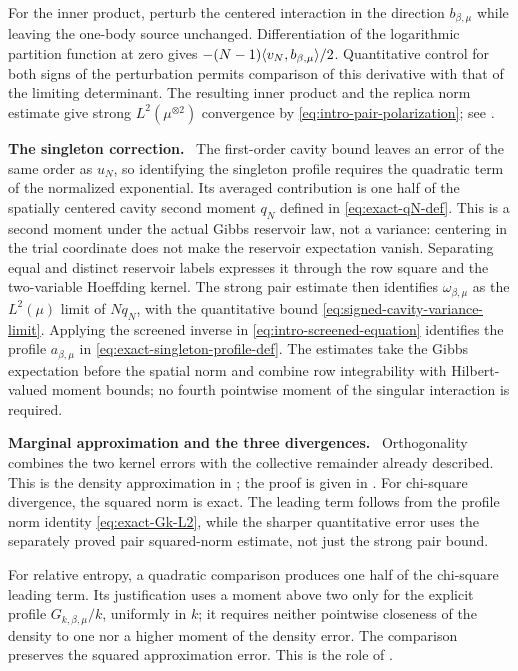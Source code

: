 \documentclass[11pt,reqno]{amsart}
\numberwithin{equation}{section}
\theoremstyle{plain}
\theoremstyle{remark}
\DeclarePairedDelimiter{\ipp}{\langle}{\rangle}
\newcommand{\be}{\beta}
\newcommand{\parheading}[1]{\par\medskip\noindent\textbf{#1}\ }
\begin{document}
For the inner product, perturb the centered interaction in the direction $b_{\be,\mu}$ while leaving the one-body source unchanged.  Differentiation of the logarithmic partition function at zero gives $-(N-1)\ipp{v_N,b_{\be,\mu}}/2$.  Quantitative control for both signs of the perturbation permits comparison of this derivative with that of the limiting determinant.  The resulting inner product and the replica norm estimate give strong $L^2(\mu^{\otimes2})$ convergence by \eqref{eq:intro-pair-polarization}; see .

\parheading{The singleton correction.}
The first-order cavity bound leaves an error of the same order as $u_N$, so identifying the singleton profile requires the quadratic term of the normalized exponential.  Its averaged contribution is one half of the spatially centered cavity second moment $q_N$ defined in \eqref{eq:exact-qN-def}.  This is a second moment under the actual Gibbs reservoir law, not a variance: centering in the trial coordinate does not make the reservoir expectation vanish.  Separating equal and distinct reservoir labels expresses it through the row square and the two-variable Hoeffding kernel.  The strong pair estimate then identifies $\omega_{\be,\mu}$ as the $L^2(\mu)$ limit of $Nq_N$, with the quantitative bound \eqref{eq:signed-cavity-variance-limit}.  Applying the screened inverse in \eqref{eq:intro-screened-equation} identifies the profile $a_{\be,\mu}$ in \eqref{eq:exact-singleton-profile-def}.  The estimates take the Gibbs expectation before the spatial norm and combine row integrability with Hilbert-valued moment bounds; no fourth pointwise moment of the singular interaction is required.

\parheading{Marginal approximation and the three divergences.}
Orthogonality combines the two kernel errors with the collective remainder already described.  This is the density approximation in ; the proof is given in .  For chi-square divergence, the squared norm is exact.  The leading term follows from the profile norm identity \eqref{eq:exact-Gk-L2}, while the sharper quantitative error uses the separately proved pair squared-norm estimate, not just the strong pair bound.

For relative entropy, a quadratic comparison produces one half of the chi-square leading term.  Its justification uses a moment above two only for the explicit profile $G_{k,\be,\mu}/k$, uniformly in $k$; it requires neither pointwise closeness of the density to one nor a higher moment of the density error.  The comparison preserves the squared approximation error.  This is the role of .
\end{document}
